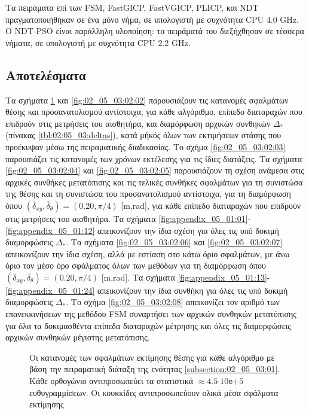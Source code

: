 Τα πειράματα επί των FSM, FastGICP, FastVGICP, PLICP, και NDT πραγματοποιήθηκαν
σε ένα μόνο νήμα, σε υπολογιστή με συχνότητα CPU $4.0$ GHz. Ο NDT-PSO είναι
παράλληλη υλοποίηση: τα πειράματά του διεξήχθησαν σε τέσσερα νήματα, σε
υπολογιστή με συχνότητα CPU $2.2$ GHz.




\subsection{Αποτελέσματα}
\label{subsection:02_05_03:02}

Τα σχήματα \ref{fig:02_05_03:02:01} και \ref{fig:02_05_03:02:02} παρουσιάζουν
τις κατανομές σφαλμάτων θέσης και προσανατολισμού αντίστοιχα, για κάθε
αλγόριθμο, επίπεδο διαταραχών που επιδρούν στις μετρήσεις του αισθητήρα, και
διαμόρφωση αρχικών συνθηκών $\Delta_\ast$ (πίνακας \ref{tbl:02:05_03:deltas}),
κατά μήκός όλων των εκτιμήσεων στάσης που προέκυψαν μέσω της πειραματικής
διαδικασίας. Το σχήμα \ref{fig:02_05_03:02:03} παρουσιάζει τις κατανομές των
χρόνων εκτέλεσης για τις ίδιες διατάξεις. Τα σχήματα \ref{fig:02_05_03:02:04}
και \ref{fig:02_05_03:02:05} παρουσιάζουν τη σχέση ανάμεσα στις αρχικές
συνθήκες μετατόπισης και τις τελικές συνθήκες σφαλμάτων για τη συνιστώσα της
θέσης και τη συνιστώσα του προσανατολισμού αντίστοιχα, για τη διαμόρφωση όπου
$(\overline{\delta}_{xy}, \overline{\delta}_{\theta}) = (0.20, \pi/4)$ [m,rad],
για κάθε επίπεδο διαταραχών που επιδρούν στις μετρήσεις του αισθητήρα.  Τα
σχήματα \ref{fig:appendix_05_01:01}-\ref{fig:appendix_05_01:12} απεικονίζουν
την ίδια σχέση για όλες τις υπό δοκιμή διαμορφώσεις $\Delta_\ast$.  Τα σχήματα
\ref{fig:02_05_03:02:06} και \ref{fig:02_05_03:02:07} απεικονίζουν την ίδια
σχέση, αλλά με εστίαση στο κάτω όριο σφαλμάτων, με άνω όριο τον μέσο όρο
σφάλματος όλων των μεθόδων για τη διαμόρφωση όπου $(\overline{\delta}_{xy},
\overline{\delta}_{\theta}) = (0.20, \pi/4)$ [m,rad]. Τα σχήματα
\ref{fig:appendix_05_01:13}-\ref{fig:appendix_05_01:24} απεικονίζουν την ίδια
συνθήκη για όλες τις υπό δοκιμή διαμορφώσεις $\Delta_*$. Το σχήμα
\ref{fig:02_05_03:02:08} απεικονίζει τον αριθμό των επανεκκινήσεων της μεθόδου
FSM συναρτήσει των αρχικών συνθηκών μετατόπισης για όλα τα
δοκιμασθέντα επίπεδα διαταραχών μέτρησης και όλες τις διαμορφώσεις αρχικών
συνθηκών μέγιστης μετατόπισης.

\begin{figure}\vspace{1cm}\hspace{0.5cm}
  
  \vspace{-4cm}
  \caption{\small Οι κατανομές των σφαλμάτων εκτίμησης θέσης για κάθε αλγόριθμο
           με βάση την πειραματική διάταξη της ενότητας
           \ref{subsection:02_05_03:01}. Κάθε ορθογώνιο αντιπροσωπεύει τα
           στατιστικά $\approx 4.5$$\cdot$$10$\texttt{e}$+$$5$ ευθυγραμμίσεων.
           Οι κουκκίδες αντιπροσωπεύουν ολικά μέσα σφάλματα εκτίμησης}
  \label{fig:02_05_03:02:01}
\end{figure}



